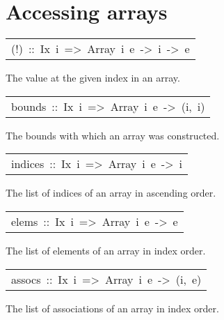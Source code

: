 \section{Accessing arrays
}
\begin{haddockdesc}
\item[\begin{tabular}{@{}l}
(!)\ ::\ Ix\ i\ =>\ Array\ i\ e\ ->\ i\ ->\ e
\end{tabular}]\haddockbegindoc
The value at the given index in an array.
\par

\end{haddockdesc}
\begin{haddockdesc}
\item[\begin{tabular}{@{}l}
bounds\ ::\ Ix\ i\ =>\ Array\ i\ e\ ->\ (i,\ i)
\end{tabular}]\haddockbegindoc
The bounds with which an array was constructed.
\par

\end{haddockdesc}
\begin{haddockdesc}
\item[\begin{tabular}{@{}l}
indices\ ::\ Ix\ i\ =>\ Array\ i\ e\ ->\ {\char 91}i{\char 93}
\end{tabular}]\haddockbegindoc
The list of indices of an array in ascending order.
\par

\end{haddockdesc}
\begin{haddockdesc}
\item[\begin{tabular}{@{}l}
elems\ ::\ Ix\ i\ =>\ Array\ i\ e\ ->\ {\char 91}e{\char 93}
\end{tabular}]\haddockbegindoc
The list of elements of an array in index order.
\par

\end{haddockdesc}
\begin{haddockdesc}
\item[\begin{tabular}{@{}l}
assocs\ ::\ Ix\ i\ =>\ Array\ i\ e\ ->\ {\char 91}(i,\ e){\char 93}
\end{tabular}]\haddockbegindoc
The list of associations of an array in index order.
\par

\end{haddockdesc}
